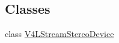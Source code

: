 \subsection*{Classes}
\begin{DoxyCompactItemize}
\item 
class \hyperlink{classV4LStreamStereoDevice}{V4\+L\+Stream\+Stereo\+Device}
\end{DoxyCompactItemize}
